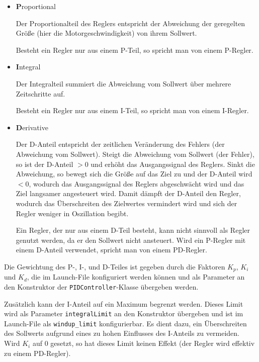 \documentclass[german]{thesis_KBS}
\newcommand{\code}[1]{\texttt{#1}}  %
\begin{document}
\begin{itemize}
    \item \textbf{P}roportional

    Der Proportionalteil des Reglers entspricht der Abweichung der geregelten
    Größe (hier die Motorgeschwindigkeit) von ihrem Sollwert.

    Besteht ein Regler nur aus einem P-Teil, so spricht man von einem P-Regler.

    \item \textbf{I}ntegral

    Der Integralteil summiert die Abweichung vom Sollwert über mehrere
    Zeitschritte auf.

    Besteht ein Regler nur aus einem I-Teil, so spricht man von einem I-Regler.

    \item \textbf{D}erivative

    Der D-Anteil entspricht der zeitlichen Veränderung des Fehlers (der
    Abweichung vom Sollwert). Steigt die Abweichung vom Sollwert (der Fehler),
    so ist der D-Anteil $> 0$ und erhöht das Ausgangssignal des Reglers. Sinkt
    die Abweichung, so bewegt sich die Größe auf das Ziel zu und der D-Anteil
    wird $< 0$, wodurch das Ausgangssignal des Reglers abgeschwächt wird und das
    Ziel langsamer angesteuert wird. Damit dämpft der D-Anteil den Regler,
    wodurch das Überschreiten des Zielwertes vermindert wird und sich der Regler
    weniger in Oszillation begibt.

    Ein Regler, der nur aus einem D-Teil besteht, kann nicht sinnvoll als Regler
    genutzt werden, da er den Sollwert nicht ansteuert. Wird ein P-Regler mit
    einem D-Anteil verwendet, spricht man von einem PD-Regler.
\end{itemize}

Die Gewichtung des P-, I-, und D-Teiles ist gegeben durch die Faktoren $K_p$,
$K_i$ und $K_d$, die im Launch-File konfiguriert werden können und als Parameter
an den Konstruktor der \code{PIDController}-Klasse übergeben werden.

Zusätzlich kann der I-Anteil auf ein Maximum begrenzt werden. Dieses Limit wird
als Parameter \code{integralLimit} an den Konstruktor übergeben und ist im
Launch-File als \code{windup\_limit} konfigurierbar. Es dient dazu, ein
Überschreiten des Sollwerts aufgrund eines zu hohen Einflusses des I-Anteils zu
vermeiden. Wird $K_i$ auf 0 gesetzt, so hat dieses Limit keinen Effekt (der
Regler wird effektiv zu einem PD-Regler).
\end{document}

